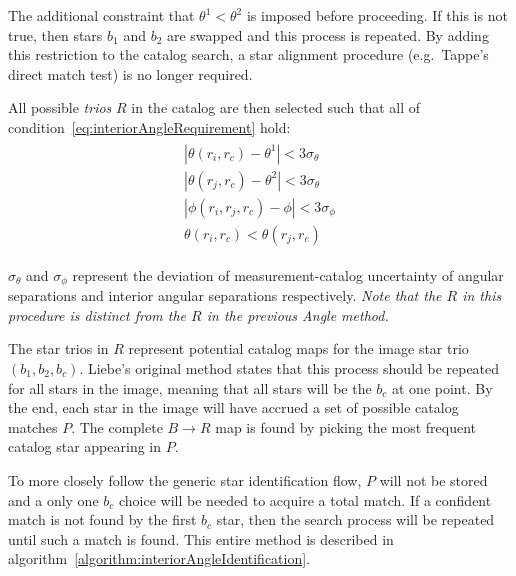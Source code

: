 The additional constraint that $\theta^1 < \theta^2$ is imposed before proceeding. If this is not true, then stars
$b_1$ and $b_2$ are swapped and this process is repeated. By adding this restriction to the catalog search, a star
alignment procedure (e.g.\ Tappe's direct match test) is no longer required.

All possible \textit{trios} $R$ in the catalog are then selected such that all of
condition~\eqref{eq:interiorAngleRequirement} hold:
\begin{align}
    \label{eq:interiorAngleRequirement}
    \begin{split}
        |\theta(r_i, r_c) - \theta^1| < 3 \sigma_{\theta}
        \\
        |\theta(r_j, r_c) - \theta^2| < 3 \sigma_{\theta}
        \\
        |\phi(r_i, r_j, r_c) - \phi| < 3 \sigma_{\phi}
        \\
        \theta(r_i, r_c) < \theta(r_j, r_c)
    \end{split}
\end{align}

$\sigma_{\theta}$ and $\sigma_{\phi}$ represent the deviation of measurement-catalog uncertainty of angular separations
and interior angular separations respectively. \textit{Note that the $R$ in this procedure is distinct from the $R$ in
the previous Angle method.}

The star trios in $R$ represent potential catalog maps for the image star trio $(b_1, b_2, b_c)$. Liebe's original
method states that this process should be repeated for all stars in the image, meaning that all stars will be the $b_c$
at one point. By the end, each star in the image will have accrued a set of possible catalog matches $P$. The complete
$B \rightarrow R$ map is found by picking the most frequent catalog star appearing in $P$.

To more closely follow the generic star identification flow, $P$ will not be stored and a only one $b_c$ choice will be
needed to acquire a total match. If a confident match is not found by the first $b_c$ star, then the search process
will be repeated until such a match is found. This entire method is described in
algorithm~\autoref{algorithm:interiorAngleIdentification}.

